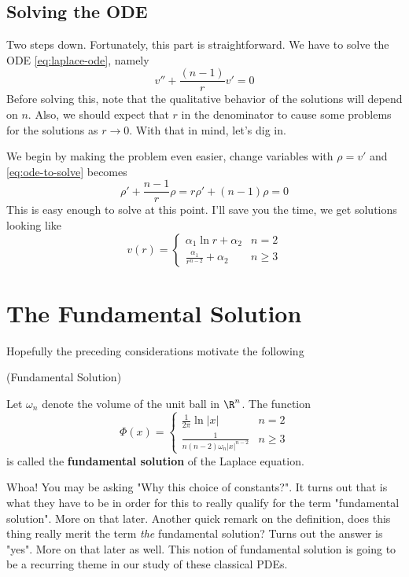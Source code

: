 \documentclass{bkcnotes}
\begin{document}
\subsection{Solving the ODE}
Two steps down. Fortunately, this part is straightforward. We have to
solve the ODE \eqref{eq:laplace-ode}, namely
\begin{equation}
  \label{eq:ode-to-solve}
  v'' + \frac{(n-1)}{r}v' = 0
\end{equation}
Before solving this, note that the qualitative behavior of the
solutions will depend on $n$. Also, we should expect that $r$ in the
denominator to cause some problems for the solutions as $r \to
0$. With that in mind, let's dig in.

We begin by making the problem even easier, change variables with
$\rho = v'$ and \eqref{eq:ode-to-solve} becomes
\begin{equation}
  \label{eq:ode-first-order}
  \rho' + \frac{n-1}{r}\rho = r\rho' + (n-1)\rho = 0
\end{equation}
This is easy enough to solve at this point. I'll save you the time, we
get solutions looking like
\begin{equation}
  \label{eq:ode-soln}
  v(r) =
  \begin{cases}
    \alpha_1\ln{r} + \alpha_2 & n=2 \\
    \frac{\alpha_1}{r^{n-2}} + \alpha_2 & n \geq 3
  \end{cases}
\end{equation}

\section{The Fundamental Solution}
Hopefully the preceding considerations motivate the following
\begin{ndefn}(Fundamental Solution)

  Let $\omega_n$ denote the volume of the unit ball in $\R^n$. The
  function
  \begin{equation}
    \label{eq:fundamental-solution}
    \Phi(x) =
    \begin{cases}
      \frac{1}{2\pi}\ln{|x|} & n=2 \\
      \frac{1}{n(n-2)\omega_n |x|^{n-2}} & n \geq 3
    \end{cases}
  \end{equation}
  is called the \textbf{fundamental solution} of the Laplace equation.
\end{ndefn}
Whoa! You may be asking "Why this choice of constants?". It turns out
that is what they have to be in order for this to really qualify for
the term "fundamental solution". More on that later. Another quick
remark on the definition, does this thing really merit the term
\emph{the} fundamental solution? Turns out the answer is "yes". More on
that later as well. This notion of fundamental solution is going to be
a recurring theme in our study of these classical PDEs.
\end{document}
